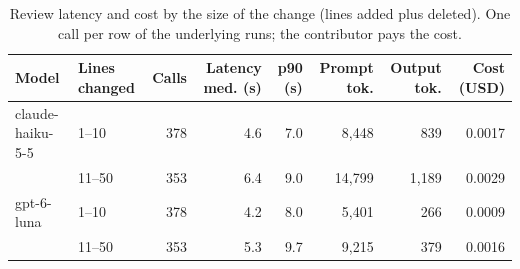\begin{table}[t]
\centering
\small
\begin{tabular}{llrrrrrr}
\toprule
Model & Lines changed & Calls & Latency med. (s) & p90 (s) & Prompt tok. & Output tok. & Cost (USD) \\
\midrule
claude-haiku-5-5 & 1--10 & 378 & 4.6 & 7.0 & 8,448 & 839 & 0.0017 \\
 & 11--50 & 353 & 6.4 & 9.0 & 14,799 & 1,189 & 0.0029 \\
\midrule
gpt-6-luna & 1--10 & 378 & 4.2 & 8.0 & 5,401 & 266 & 0.0009 \\
 & 11--50 & 353 & 5.3 & 9.7 & 9,215 & 379 & 0.0016 \\
\bottomrule
\end{tabular}
\caption{Review latency and cost by the size of the change (lines added plus deleted). One call per row of the underlying runs; the contributor pays the cost.}
\label{tab:scaling}
\end{table}
